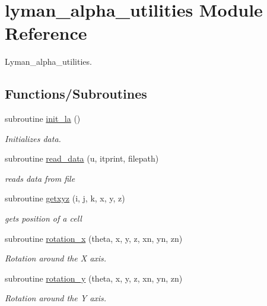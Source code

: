 \hypertarget{namespacelyman__alpha__utilities}{}\section{lyman\+\_\+alpha\+\_\+utilities Module Reference}
\label{namespacelyman__alpha__utilities}


Lyman\+\_\+alpha\+\_\+utilities.  


\subsection*{Functions/\+Subroutines}
\begin{DoxyCompactItemize}
\item 
subroutine \hyperlink{namespacelyman__alpha__utilities_a5f97eeffb7ea030271481514d7072efb}{init\+\_\+la} ()
\begin{DoxyCompactList}\small\item\em Initializes data. \end{DoxyCompactList}\item 
subroutine \hyperlink{namespacelyman__alpha__utilities_a75d86f06c6da27d0754752c23c50b54a}{read\+\_\+data} (u, itprint, filepath)
\begin{DoxyCompactList}\small\item\em reads data from file \end{DoxyCompactList}\item 
subroutine \hyperlink{namespacelyman__alpha__utilities_abdefc59ee98b1526aa3116c0e8f21d98}{getxyz} (i, j, k, x, y, z)
\begin{DoxyCompactList}\small\item\em gets position of a cell \end{DoxyCompactList}\item 
subroutine \hyperlink{namespacelyman__alpha__utilities_afaddcbb27f079d4300ce631609bbb80d}{rotation\+\_\+x} (theta, x, y, z, xn, yn, zn)
\begin{DoxyCompactList}\small\item\em Rotation around the X axis. \end{DoxyCompactList}\item 
subroutine \hyperlink{namespacelyman__alpha__utilities_ae865cec09dd956ff966316caf8ac0c9a}{rotation\+\_\+y} (theta, x, y, z, xn, yn, zn)
\begin{DoxyCompactList}\small\item\em Rotation around the Y axis. \end{DoxyCompactList}\item 

\end{DoxyCompactItemize}
